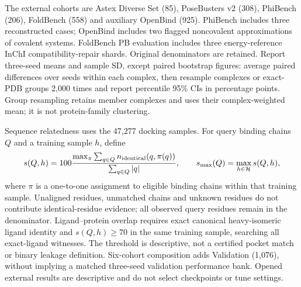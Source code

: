 The external cohorts are Astex Diverse Set (85), PoseBusters v2 (308),
PhiBench (206), FoldBench (558) and auxiliary OpenBind (925). PhiBench includes
three reconstructed cases; OpenBind includes two flagged noncovalent
approximations of covalent systems. FoldBench PB evaluation includes three
energy-reference InChI compatibility-repair shards. Original denominators are
retained. Report three-seed means and sample SD, except paired bootstrap
figures: average paired differences over seeds within each complex, then
resample complexes or exact-PDB groups 2,000 times and report percentile
95\% CIs in percentage points. Group resampling retains member complexes
and uses their complex-weighted mean; it is not protein-family clustering.

Sequence relatedness uses the 47,277 docking samples. For query binding
chains $Q$ and a training sample $h$, define
\begin{equation}
 s(Q,h)=100\frac{\max_{\pi}\sum_{q\in Q}n_{\rm identical}(q,\pi(q))}
 {\sum_{q\in Q}|q|},\qquad s_{\max}(Q)=\max_{h\in\mathcal H}s(Q,h),
\end{equation}
where $\pi$ is a one-to-one assignment to eligible binding chains within
that training sample. Unaligned residues, unmatched chains and unknown
residues do not contribute identical-residue evidence; all observed query
residues remain in the denominator. Ligand--protein overlap requires exact
canonical heavy-isomeric ligand identity and $s(Q,h)\ge70$ in the same
training sample, searching all exact-ligand witnesses. The threshold is
descriptive, not a certified pocket match or binary leakage definition.
Six-cohort composition adds Validation (1,076), without implying a matched
three-seed validation performance bank. Opened external results are
descriptive and do not select checkpoints or tune settings.
